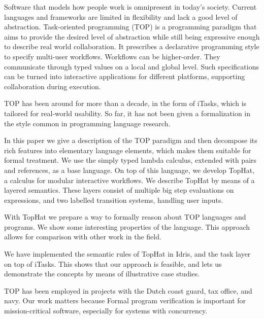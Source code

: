 
Software that models how people work is omnipresent in today's society.
Current languages and frameworks are limited in flexibility and lack a good level of abstraction. 
Task-oriented programming (TOP) is a programming paradigm that aims to provide the desired level of abstraction while still being expressive enough to describe real world collaboration.
It prescribes a declarative programming style to specify multi-user workflows.
Workflows can be higher-order.
They communicate through typed values on a local and global level.
Such specifications can be turned into interactive applications for different platforms, supporting collaboration during execution.

TOP has been around for more than a decade, in the form of iTasks, which is tailored for real-world usability.
So far, it has not been given a formalization in the style common in programming language research. 

In this paper we give a description of the TOP paradigm and then decompose its rich features into elementary language elements, which makes them suitable for formal treatment.
We use the simply typed lambda calculus, extended with pairs and references, as a base language.
On top of this language, we develop TopHat, a calculus for modular interactive workflows.
We describe TopHat by means of a layered semantics.
These layers consist of multiple big step evaluations on expressions, and two labelled transition systems, handling user inputs.

With TopHat we prepare a way to formally reason about TOP languages and programs.
We show some interesting properties of the language.
This approach allows for comparison with other work in the field.

We have implemented the semantic rules of TopHat in Idris, and the task layer on top of iTasks.
This shows that our approach is feasible, and lets us demonstrate the concepts by means of illustrative case studies.

TOP has been employed in projects with the Dutch coast guard, tax office, and navy.
Our work matters because Formal program verification is important for mission-critical software, especially for systems with concurrency.



